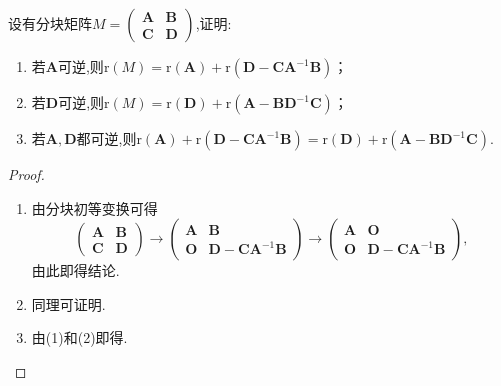 \documentclass[../../main.tex]{subfiles}%
\begin{document}
\begin{proposition}[秩的降阶公式]\label{proposition:秩的降阶公式}
设有分块矩阵\(M = \begin{pmatrix}
\boldsymbol{A}&\boldsymbol{B}\\
\boldsymbol{C}&\boldsymbol{D}
\end{pmatrix}\),证明:
\begin{enumerate}[(1)]
\item 若\(\boldsymbol{A}\)可逆,则\(\mathrm{r}(M)=\mathrm{r}(\boldsymbol{A})+\mathrm{r}(\boldsymbol{D}-\boldsymbol{C}\boldsymbol{A}^{-1}\boldsymbol{B})\)；

\item 若\(\boldsymbol{D}\)可逆,则\(\mathrm{r}(M)=\mathrm{r}(\boldsymbol{D})+\mathrm{r}(\boldsymbol{A}-\boldsymbol{B}\boldsymbol{D}^{-1}\boldsymbol{C})\)；

\item 若\(\boldsymbol{A},\boldsymbol{D}\)都可逆,则\(\mathrm{r}(\boldsymbol{A})+\mathrm{r}(\boldsymbol{D}-\boldsymbol{C}\boldsymbol{A}^{-1}\boldsymbol{B})=\mathrm{r}(\boldsymbol{D})+\mathrm{r}(\boldsymbol{A}-\boldsymbol{B}\boldsymbol{D}^{-1}\boldsymbol{C})\).
\end{enumerate}
\end{proposition}
\begin{proof}
\begin{enumerate}[(1)]
\item 由分块初等变换可得
\[
\begin{pmatrix}
\boldsymbol{A}&\boldsymbol{B}\\
\boldsymbol{C}&\boldsymbol{D}
\end{pmatrix}\to
\begin{pmatrix}
\boldsymbol{A}&\boldsymbol{B}\\
\boldsymbol{O}&\boldsymbol{D}-\boldsymbol{C}\boldsymbol{A}^{-1}\boldsymbol{B}
\end{pmatrix}\to
\begin{pmatrix}
\boldsymbol{A}&\boldsymbol{O}\\
\boldsymbol{O}&\boldsymbol{D}-\boldsymbol{C}\boldsymbol{A}^{-1}\boldsymbol{B}
\end{pmatrix},
\]
由此即得结论.

\item 同理可证明.

\item 由(1)和(2)即得. 
\end{enumerate}
\end{proof}
\end{document}
